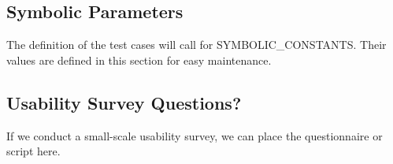 \documentclass[12pt, titlepage]{article}
\begin{document}
\subsection{Symbolic Parameters}

The definition of the test cases will call for SYMBOLIC\_CONSTANTS.
Their values are defined in this section for easy maintenance.

\subsection{Usability Survey Questions?}

If we conduct a small-scale usability survey, we can place the questionnaire or script here.


\newpage{}
\end{document}
